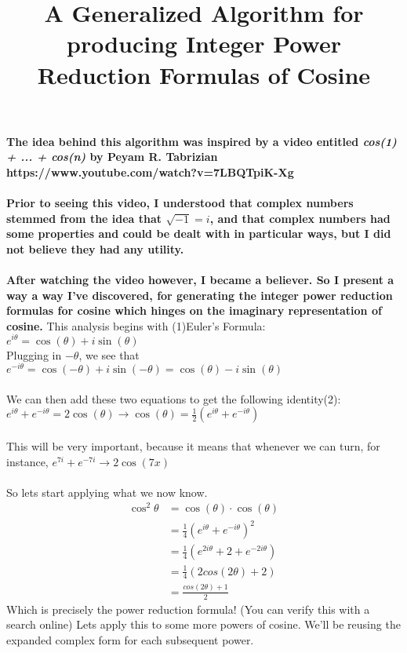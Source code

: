 \documentclass[12pt]{article}
\title{A Generalized Algorithm for producing Integer Power Reduction Formulas
of Cosine}
\begin{document}
\maketitle
\noindent \textbf{The idea behind this algorithm was inspired by a video 
entitled \textit{cos(1) + ... + cos(n)} by Peyam R. Tabrizian}
\\
\textbf{https://www.youtube.com/watch?v=7LBQTpiK-Xg}
\\
\\
\textbf{Prior to seeing this video, I understood that complex numbers stemmed from
the idea that $\sqrt{-1} = i$, and that complex numbers had some properties and
could be dealt with in particular ways, but I did not believe they had any utility.}
\\
\\
\textbf{After watching the video however, I became a believer. So I present a way
a way I've discovered, for generating the integer power reduction formulas for cosine which hinges on the imaginary representation of cosine.}
\newpage
\noindent This analysis begins with (1)Euler's Formula:
$e^{i\theta} = \cos(\theta) + i\sin(\theta)$
\\
Plugging in $-\theta$, we see that 
$e^{-i\theta} = \cos(-\theta) + i\sin(-\theta) = \cos(\theta) - i\sin(\theta)$
\\
\\
We can then add these two equations to get the following identity(2):
\\
$e^{i\theta} + e^{-i\theta} = 2\cos(\theta) \to 
\cos(\theta) = \frac{1}{2}(e^{i\theta} + e^{-i\theta})$
\\
\\
This will be very important, because it means that whenever we can turn, for instance, $e^{7i} + e^{-7i} \to 2\cos(7x)$
\\
\\
So lets start applying what we now know.
\begin{align}
\cos^2\theta &= \cos(\theta) \cdot \cos(\theta) 
\\
&= \frac{1}{4}(e^{i\theta} + e^{-i\theta})^2
\\
&= \frac{1}{4}(e^{2i\theta} + 2 + e^{-2i\theta})
\\
&= \frac{1}{4}(2cos(2\theta) + 2)
\\
&= \frac{cos(2\theta) + 1}{2}
\end{align}
Which is precisely the power reduction formula! (You can verify this with a search online) Lets apply this to some more powers of cosine. We'll be reusing the expanded complex form for each subsequent power.
\end{document}
